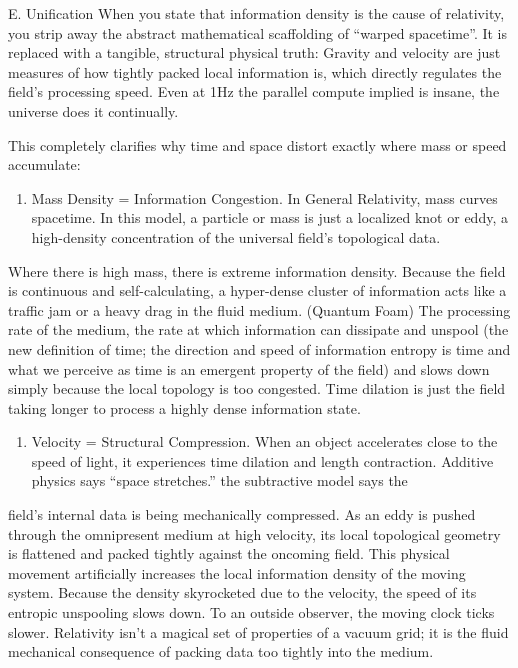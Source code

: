 E. Unification When you state that information density is the cause of relativity, you strip away the abstract mathematical scaffolding of ``warped spacetime''. It is replaced with a tangible, structural physical truth: Gravity and velocity are just measures of how tightly packed local information is, which directly regulates the field's processing speed. Even at 1Hz the parallel compute implied is insane, the universe does it continually.

This completely clarifies why time and space distort exactly where mass or speed accumulate:

\begin{enumerate}
\item Mass Density = Information Congestion. In General Relativity, mass curves spacetime. In this model, a particle or mass is just a localized knot or eddy, a high-density concentration of the universal field's topological data.
\end{enumerate}

Where there is high mass, there is extreme information density. Because the field is continuous and self-calculating, a hyper-dense cluster of information acts like a traffic jam or a heavy drag in the fluid medium. (Quantum Foam) The processing rate of the medium, the rate at which information can dissipate and unspool (the new definition of time; the direction and speed of information entropy is time and what we perceive as time is an emergent property of the field) and slows down simply because the local topology is too congested. Time dilation is just the field taking longer to process a highly dense information state.

\begin{enumerate}
\item Velocity = Structural Compression. When an object accelerates close to the speed of light, it experiences time dilation and length contraction. Additive physics says ``space stretches.'' the subtractive model says the
\end{enumerate}

field's internal data is being mechanically compressed. As an eddy is pushed through the omnipresent medium at high velocity, its local topological geometry is flattened and packed tightly against the oncoming field. This physical movement artificially increases the local information density of the moving system. Because the density skyrocketed due to the velocity, the speed of its entropic unspooling slows down. To an outside observer, the moving clock ticks slower. Relativity isn't a magical set of properties of a vacuum grid; it is the fluid mechanical consequence of packing data too tightly into the medium.


